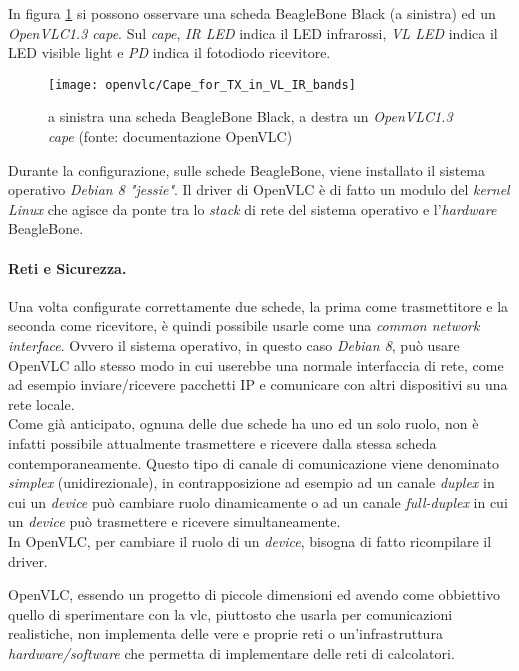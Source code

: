 In figura \ref{fig:beaglebone_cape} si possono osservare una scheda BeagleBone Black (a sinistra) ed un \textit{OpenVLC1.3 cape}. Sul \textit{cape}, \textit{IR LED} indica il LED infrarossi, \textit{VL LED} indica il LED visible light e \textit{PD} indica il fotodiodo ricevitore.
\begin{figure}[H] 
    \centering 
    \texttt{[image: openvlc/Cape\_for\_TX\_in\_VL\_IR\_bands]}
    \caption{a sinistra una scheda BeagleBone Black, a destra un \textit{OpenVLC1.3 cape} (fonte: documentazione OpenVLC)}
    \label{fig:beaglebone_cape}
\end{figure}

Durante la configurazione, sulle schede BeagleBone, viene installato il sistema operativo \textit{Debian 8 "jessie"}. Il driver di OpenVLC è di fatto un modulo del \textit{kernel} \textit{Linux} che agisce da ponte tra lo \textit{stack} di rete del sistema operativo e l'\textit{hardware} BeagleBone.

\paragraph{Reti e Sicurezza.}
Una volta configurate correttamente due schede, la prima come trasmettitore e la seconda come ricevitore, è quindi possibile usarle come una \textit{common network interface}. Ovvero il sistema operativo, in questo caso \textit{Debian 8}, può usare OpenVLC allo stesso modo in cui userebbe una normale interfaccia di rete, come ad esempio inviare/ricevere pacchetti IP e comunicare con altri dispositivi su una rete locale.\\
Come già anticipato, ognuna delle due schede ha uno ed un solo ruolo, non è infatti possibile attualmente trasmettere e ricevere dalla stessa scheda contemporaneamente. Questo tipo di canale di comunicazione viene denominato \textit{simplex} (unidirezionale), in contrapposizione ad esempio ad un canale \textit{duplex} in cui un \textit{device} può cambiare ruolo dinamicamente o ad un canale \textit{full-duplex} in cui un \textit{device} può trasmettere e ricevere simultaneamente.\\
In OpenVLC, per cambiare il ruolo di un \textit{device}, bisogna di fatto ricompilare il driver.

OpenVLC, essendo un progetto di piccole dimensioni ed avendo come obbiettivo quello di sperimentare con la \gls{vlc}, piuttosto che usarla per comunicazioni realistiche, non implementa delle vere e proprie reti o un'infrastruttura \textit{hardware/software} che permetta di implementare delle reti di calcolatori.

